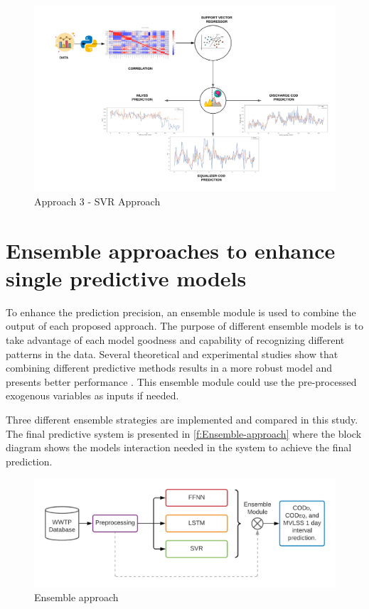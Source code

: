 \begin{figure}[h]
\centering
\includegraphics[width=\linewidth]{figures/Ch4/Approach3.pdf}
\caption{Approach 3 - SVR Approach}
\label{f:Approach 3}
\end{figure}

\section{Ensemble approaches to enhance single predictive models}
\label{s:Ensembles}

To enhance the prediction precision, an ensemble module is used to combine the output of each proposed approach. The purpose of different ensemble models is to take advantage of each model goodness and capability of recognizing different patterns in the data. Several theoretical and experimental studies show that combining different predictive methods results in a more robust model and presents better performance \cite{Nourani2021}. This ensemble module could use the pre-processed exogenous variables as inputs if needed.

Three different ensemble strategies are implemented and compared in this study. The final predictive system is presented in \autoref{f:Ensemble-approach} where the block diagram shows the models interaction needed in the system to achieve the final prediction. 

\begin{figure}[h]
\centering
\includegraphics[width=\linewidth]{figures/Ch5/Thesis-Approaches-Ensemble.pdf}
\caption{Ensemble approach}
\label{f:Ensemble-approach}
\end{figure}

